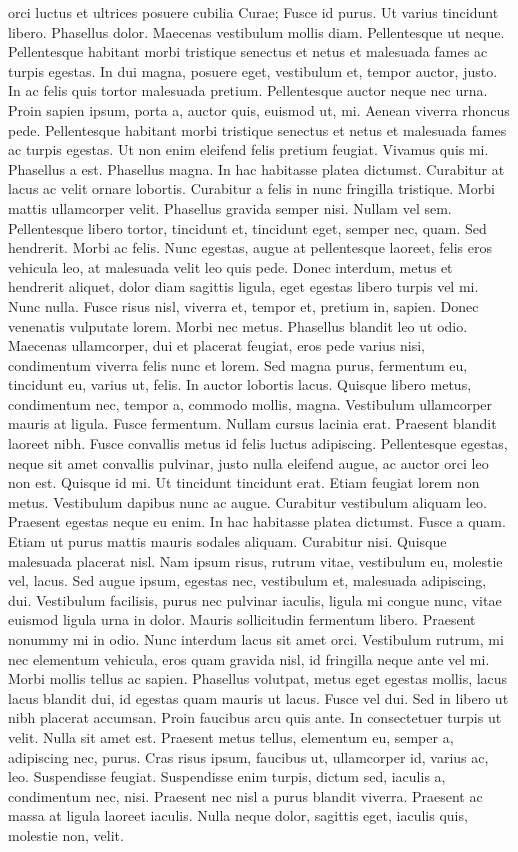 orci luctus et ultrices posuere cubilia Curae; Fusce id purus. Ut varius tincidunt libero. Phasellus dolor. Maecenas vestibulum mollis diam. Pellentesque ut neque. Pellentesque habitant morbi tristique senectus et netus et malesuada fames ac turpis egestas. In dui magna, posuere eget, vestibulum et, tempor auctor, justo. In ac felis quis tortor malesuada pretium. Pellentesque auctor neque nec urna. Proin sapien ipsum, porta a, auctor quis, euismod ut, mi. Aenean viverra rhoncus pede. Pellentesque habitant morbi tristique senectus et netus et malesuada fames ac turpis egestas. Ut non enim eleifend felis pretium feugiat. Vivamus quis mi. Phasellus a est. Phasellus magna. In hac habitasse platea dictumst. Curabitur at lacus ac velit ornare lobortis. Curabitur a felis in nunc fringilla tristique. Morbi mattis ullamcorper velit. Phasellus gravida semper nisi. Nullam vel sem. Pellentesque libero tortor, tincidunt et, tincidunt eget, semper nec, quam. Sed hendrerit. Morbi ac felis. Nunc egestas, augue at pellentesque laoreet, felis eros vehicula leo, at malesuada velit leo quis pede. Donec interdum, metus et hendrerit aliquet, dolor diam sagittis ligula, eget egestas libero turpis vel mi. Nunc nulla. Fusce risus nisl, viverra et, tempor et, pretium in, sapien. Donec venenatis vulputate lorem. Morbi nec metus. Phasellus blandit leo ut odio. Maecenas ullamcorper, dui et placerat feugiat, eros pede varius nisi, condimentum viverra felis nunc et lorem. Sed magna purus, fermentum eu, tincidunt eu, varius ut, felis. In auctor lobortis lacus. Quisque libero metus, condimentum nec, tempor a, commodo mollis, magna. Vestibulum ullamcorper mauris at ligula. Fusce fermentum. Nullam cursus lacinia erat. Praesent blandit laoreet nibh. Fusce convallis metus id felis luctus adipiscing. Pellentesque egestas, neque sit amet convallis pulvinar, justo nulla eleifend augue, ac auctor orci leo non est. Quisque id mi. Ut tincidunt tincidunt erat. Etiam feugiat lorem non metus. Vestibulum dapibus nunc ac augue. Curabitur vestibulum aliquam leo. Praesent egestas neque eu enim. In hac habitasse platea dictumst. Fusce a quam. Etiam ut purus mattis mauris sodales aliquam. Curabitur nisi. Quisque malesuada placerat nisl. Nam ipsum risus, rutrum vitae, vestibulum eu, molestie vel, lacus. Sed augue ipsum, egestas nec, vestibulum et, malesuada adipiscing, dui. Vestibulum facilisis, purus nec pulvinar iaculis, ligula mi congue nunc, vitae euismod ligula urna in dolor. Mauris sollicitudin fermentum libero. Praesent nonummy mi in odio. Nunc interdum lacus sit amet orci. Vestibulum rutrum, mi nec elementum vehicula, eros quam gravida nisl, id fringilla neque ante vel mi. Morbi mollis tellus ac sapien. Phasellus volutpat, metus eget egestas mollis, lacus lacus blandit dui, id egestas quam mauris ut lacus. Fusce vel dui. Sed in libero ut nibh placerat accumsan. Proin faucibus arcu quis ante. In consectetuer turpis ut velit. Nulla sit amet est. Praesent metus tellus, elementum eu, semper a, adipiscing nec, purus. Cras risus ipsum, faucibus ut, ullamcorper id, varius ac, leo. Suspendisse feugiat. Suspendisse enim turpis, dictum sed, iaculis a, condimentum nec, nisi. Praesent nec nisl a purus blandit viverra. Praesent ac massa at ligula laoreet iaculis. Nulla neque dolor, sagittis eget, iaculis quis, molestie non, velit. 